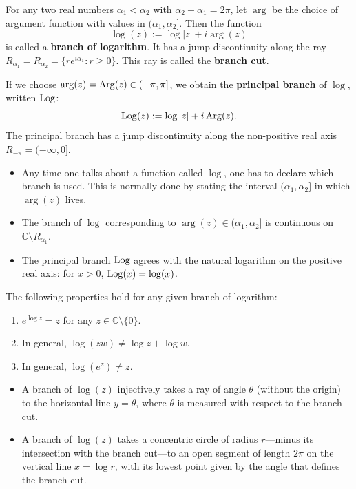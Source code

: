 \documentclass[11pt, a4paper]{article}
\begin{document}
\begin{defbox}
For any two real numbers $\alpha_1<\alpha_2$ with $\alpha_2-\alpha_1=2\pi$, let $\arg$ be the choice of argument function with values in $(\alpha_1,\alpha_2]$. Then the function
\[
  \log(z) := \log|z| + i\arg(z)
\]
is called a \textbf{branch of logarithm}. It has a jump discontinuity along the ray $R_{\alpha_1}=R_{\alpha_2}=\{re^{i\alpha_1}:r\geq 0\}$. This ray is called the \textbf{branch cut}.

If we choose $\arg(z)=\operatorname{Arg}(z)\in(-\pi,\pi]$, we obtain the \textbf{principal branch} of $\log$, written $\operatorname{Log}$:
\[
  \operatorname{Log}(z) := \log|z| + i\operatorname{Arg}(z).
\]
The principal branch has a jump discontinuity along the non-positive real axis $R_{-\pi}=(-\infty,0]$.
\end{defbox}

\begin{warnbox}[Remark 1.19]
\begin{itemize}
  \item Any time one talks about a function called $\log$, one has to declare which branch is used. This is normally done by stating the interval $(\alpha_1,\alpha_2]$ in which $\arg(z)$ lives.
  \item The branch of $\log$ corresponding to $\arg(z)\in(\alpha_1,\alpha_2]$ is continuous on $\mathbb{C}\setminus R_{\alpha_1}$.
  \item The principal branch $\operatorname{Log}$ agrees with the natural logarithm on the positive real axis: for $x>0$, $\operatorname{Log}(x)=\log(x)$.
\end{itemize}
\end{warnbox}

\begin{thmbox}
The following properties hold for any given branch of logarithm:
\begin{enumerate}
  \item $e^{\log z}=z$ for any $z\in\mathbb{C}\setminus\{0\}$.
  \item In general, $\log(zw)\neq\log z+\log w$.
  \item In general, $\log(e^z)\neq z$.
\end{enumerate}
\end{thmbox}

\begin{thmbox}
\begin{itemize}
  \item A branch of $\log(z)$ injectively takes a ray of angle $\theta$ (without the origin) to the horizontal line $y=\theta$, where $\theta$ is measured with respect to the branch cut.
  \item A branch of $\log(z)$ takes a concentric circle of radius $r$---minus its intersection with the branch cut---to an open segment of length $2\pi$ on the vertical line $x=\log r$, with its lowest point given by the angle that defines the branch cut.
\end{itemize}
\end{thmbox}
\end{document}
